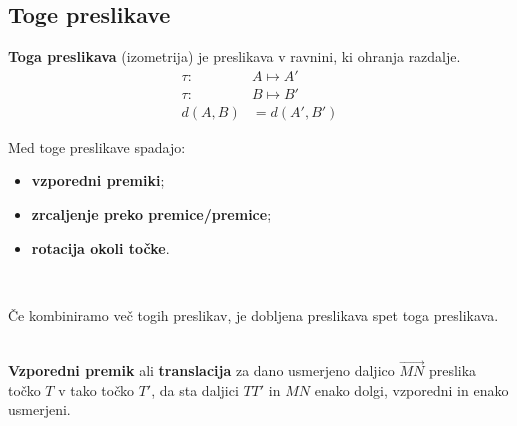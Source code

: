                                         


        


        
        \subsection*{Toge preslikave}
            
            \begin{definicija}
                \textbf{Toga preslikava} (izometrija) je preslikava v ravnini, ki ohranja razdalje.
                \begin{align*}
                    \tau:~ &A \mapsto A' \\ 
                    \tau:~ &B \mapsto B' \\ 
                    d(A,B)&=d(A',B')
                \end{align*}
            \end{definicija}

            
                Med toge preslikave spadajo:
                    \begin{itemize}
                        \item \textbf{vzporedni premiki};
                        \item \textbf{zrcaljenje preko premice/premice};
                        \item \textbf{rotacija okoli točke}.
                    \end{itemize}

                    ~

                Če kombiniramo več togih preslikav, je dobljena preslikava spet toga preslikava.

                
        

                ~\\
        

            
                \textbf{Vzporedni premik} ali \textbf{translacija} za dano usmerjeno daljico $\overrightarrow{MN}$ preslika točko $T$ v tako točko $T'$, da sta daljici $TT'$ in $MN$ enako dolgi, vzporedni in enako usmerjeni. \\  %
                
